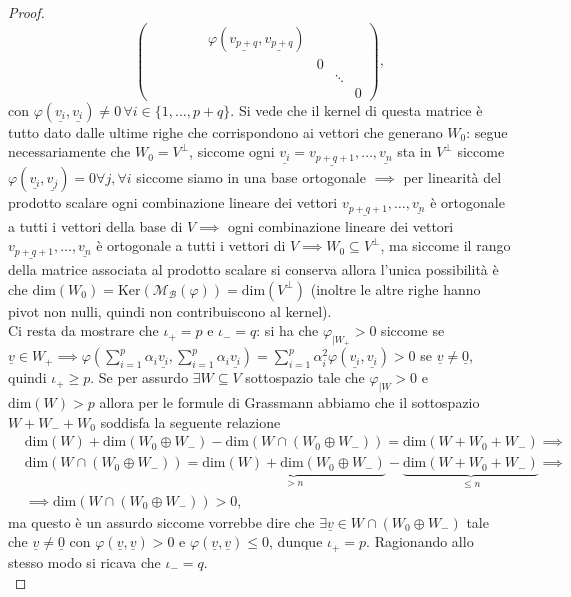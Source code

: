 \begin{proof}
$$\begin{pmatrix}
			& & & & & \varphi(\underline{v_{p+q}}, \underline{v_{p+q}}) \\
			& & & & & & 0 & & \\
			& & & & & & & \ddots & \\
			& & & & & & & & 0
		\end{pmatrix},
	$$
	con $\varphi(\underline{v_i}, \underline{v_i}) \neq 0 \, \forall i \in \{ 1, \ldots, p+q \}$. Si vede che il kernel di questa matrice è tutto dato dalle ultime righe che corrispondono ai vettori che generano $W_0$: segue necessariamente che $W_0 = V^\perp$, siccome ogni $\underline{v_i} = \underline{v_{p+q+1}}, \ldots, \underline{v_n}$ sta in $V^\perp$ siccome $\varphi(\underline{v_i}, \underline{v_j}) = 0 \forall j, \forall i$ siccome siamo in una base ortogonale $\implies$ per linearità del prodotto scalare ogni combinazione lineare dei vettori $\underline{v_{p+q+1}}, \ldots, \underline{v_n}$ è ortogonale a tutti i vettori della base di $V \implies$ ogni combinazione lineare dei vettori $\underline{v_{p+q+1}}, \ldots, \underline{v_n}$ è ortogonale a tutti i vettori di $V \implies W_0 \subseteq V^\perp$, ma siccome il rango della matrice associata al prodotto scalare si conserva allora l'unica possibilità è che $\text{dim}(W_0) = \text{Ker}(\mathcal{M}_{\mathcal{B}}(\varphi)) = \text{dim}(V^\perp)$ (inoltre le altre righe hanno pivot non nulli, quindi non contribuiscono al kernel). \\ 
	Ci resta da mostrare che $\iota_+ = p$ e $\iota_- = q$: si ha che
	$\varphi_{|W_+} > 0$ siccome se $\underline{v} \in W_+ \implies \varphi(\sum\limits_{i=1}^p \alpha_i \underline{v_i}, \sum\limits_{i=1}^p \alpha_i \underline{v_i}) = \sum\limits_{i=1}^p \alpha_i^2 \varphi(\underline{v_i}, \underline{v_i}) > 0$ se $\underline{v} \neq \underline{0}$, quindi $\iota_+ \geq p$. Se per assurdo $\exists W \subseteq V$ sottospazio tale che $\varphi_{|W} > 0$ e $\text{dim}(W) > p$ allora per le formule di Grassmann abbiamo che il sottospazio $W + W_- + W_0$ soddisfa la seguente relazione
	\begin{align}
		&\text{dim}(W) + \text{dim}(W_0 \oplus W_-) - \text{dim}(W \cap (W_0 \oplus W_-)) = \text{dim}(W + W_0 + W_-) \implies \\ 
		&\text{dim}(W \cap (W_0 \oplus W_-)) = \underbrace{\text{dim}(W) + \text{dim}(W_0 \oplus W_-)}_{> n} - \underbrace{\text{dim}(W + W_0 + W_-)}_{\leq n} \implies \\
		&\implies \text{dim}(W \cap (W_0 \oplus W_-)) > 0,
	\end{align}
	ma questo è un assurdo siccome vorrebbe dire che $\exists \underline{v} \in W \cap (W_0 \oplus W_-)$ tale che $\underline{v} \neq \underline{0}$ con $\varphi(\underline{v}, \underline{v}) > 0$ e $\varphi(\underline{v}, \underline{v}) \leq 0$, dunque $\iota_+ = p$. Ragionando allo stesso modo si ricava che $\iota_- = q$. \\

\end{proof}
